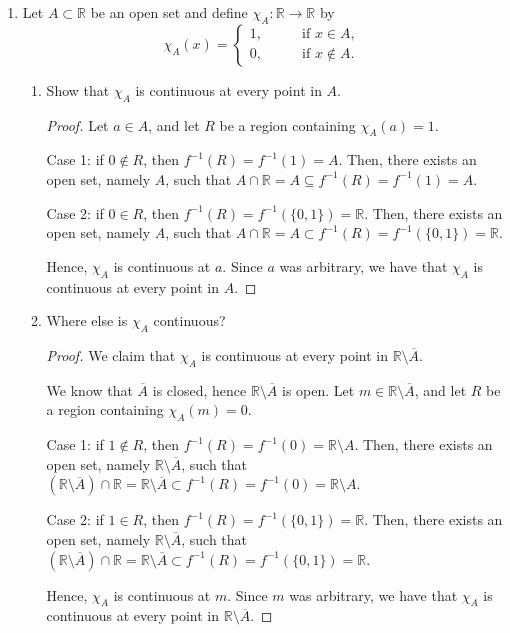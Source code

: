 \documentclass[11pt]{article}
\newcommand{\bbR}{\mathbb{R}}
\providecommand{\sm}{\setminus}
\renewcommand{\_}[1]{\underline{ #1 }}
\theoremstyle{definition}
\numberwithin{equation}{subsection}
\begin{document}
\begin{enumerate}
\item
Let $A \subset \bbR$ be an open set and define $\chi_A: \bbR \to \bbR$ by
\[
	\chi_A(x) =
		\begin{cases}
			1, \qquad &\text{if } x \in A,\\
			0, &\text{if } x \notin A.
		\end{cases}
\]
\begin{enumerate}
	\item Show that $\chi_A$ is continuous at every point in $A$.


\begin{proof}
Let $a \in A$, and let $R$ be a region containing $\chi_A(a)=1$. 

Case 1: if $0 \notin R$, then $f^{-1}(R)=f^{-1}(1)=A$. Then, there exists an open set, namely $A$, such that $A \cap \bbR = A \subseteq f^{-1}(R)=f^{-1}(1)=A$.

Case 2: if $0 \in R$, then $f^{-1}(R)=f^{-1}(\{0,1\})=\bbR$. Then, there exists an open set, namely $A$, such that $A \cap \bbR=A \subset f^{-1}(R)=f^{-1}(\{0,1\})=\bbR$.

Hence, $\chi_A$ is continuous at $a$. Since $a$ was arbitrary, we have that $\chi_A$ is continuous at every point in $A$.

\renewcommand\qedsymbol{QED}
\end{proof}


	\item Where else is $\chi_A$ continuous?


\begin{proof}
We claim that $\chi_A$ is continuous at every point in $\bbR \sm \overline{A}$. 

We know that $\overline{A}$ is closed, hence $\bbR \sm \overline{A}$ is open. Let $m \in \bbR \sm \overline{A}$, and let $R$ be a region containing $\chi_A(m)=0$. 

Case 1: if $1\notin R$, then $f^{-1}(R)=f^{-1}(0)=\bbR\sm A$. Then, there exists an open set, namely $\bbR \sm \overline{A}$, such that $(\bbR \sm \overline{A}) \cap \bbR = \bbR \sm \overline{A} \subset f^{-1}(R)=f^{-1}(0)=\bbR \sm A$. 

Case 2: if $1 \in R$, then $f^{-1}(R)=f^{-1}(\{0,1\})=\bbR$. Then, there exists an open set, namely $\bbR \sm \overline{A}$, such that $(\bbR \sm \overline{A}) \cap \bbR=\bbR \sm \overline{A} \subset f^{-1}(R)=f^{-1}(\{0,1\})=\bbR$.


Hence, $\chi_A$ is continuous at $m$. Since $m$ was arbitrary, we have that $\chi_A$ is continuous at every point in $\bbR \sm \overline{A}$.



\end{proof}
\end{enumerate}
\end{enumerate}
\end{document}
